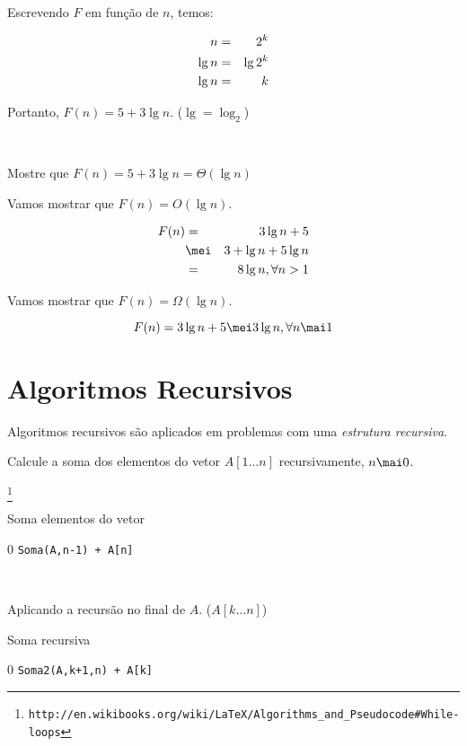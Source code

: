 \documentclass[a4paper]{memoir}
\newcommand{\un}{1 \ldots n}
\begin{document}
\begin{sol}
Escrevendo $F$ em função de $n$, temos:

\begin{eqnarray*}
  n &=& 2^k  \hfill \\
  \lg n &=& \lg 2^k  \hfill \\
  \lg n &=& k \hfill \\ 
\end{eqnarray*}

Portanto, $F(n) = 5 + 3 \lg n$. ($\lg = \log _2$)

\

Mostre que $F(n) = 5 + 3 \lg n = \Theta(\lg n)$

Vamos mostrar que $F(n) = O(\lg n)$.

\begin{eqnarray*}
  F(n) &=& 3\lg n + 5 \hfill \\
  &\mei& 3 + \lg n + 5\lg n \hfill \\
   &=& 8\lg n,\forall n > 1 \hfill \\ 
\end{eqnarray*}

Vamos mostrar que $F(n) = \Omega(\lg n)$.

\[
F(n) = 3\lg n + 5 \mei 3 \lg n,\forall n \mai 1
\]

\end{sol}


\chapter{Algoritmos Recursivos}

Algoritmos recursivos são aplicados em problemas com uma \emph{estrutura recursiva}.

\begin{ex}[Soma]
Calcule a soma dos elementos do vetor $A[\un]$ recursivamente, $n \mai 0$.
\end{ex}

\begin{sol}
\footnote{\texttt{http://en.wikibooks.org/wiki/LaTeX/Algorithms\_and\_Pseudocode\#While-loops}}
\begin{algorithm}
\caption*{Soma elementos do vetor}
\begin{algorithmic}[1]
  \State \Return $0$
\Else
  \State \Return \texttt{Soma(A,n-1) + A[n]}
\EndIf
\EndFunction
\end{algorithmic}
\end{algorithm}

\

Aplicando a recursão no final de $A$. ($A[k \ldots n]$)

\begin{algorithm}
\caption*{Soma recursiva}
\begin{algorithmic}[1]
    \State \Return $0$
\Else
    \State \Return \texttt{Soma2(A,k+1,n) + A[k]}
\EndIf
\EndFunction
\end{algorithmic}
\end{algorithm}

\end{sol}
\end{document}
